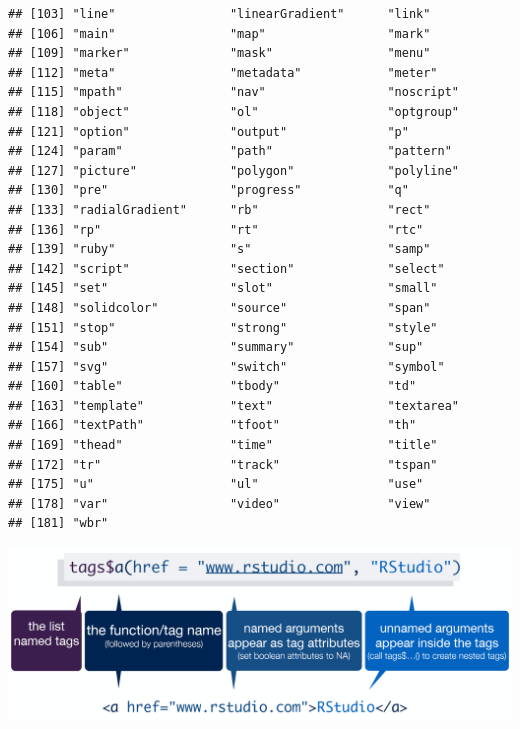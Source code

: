 \documentclass[
]{article}
\begin{document}
\begin{verbatim}
## [103] "line"                "linearGradient"      "link"               
## [106] "main"                "map"                 "mark"               
## [109] "marker"              "mask"                "menu"               
## [112] "meta"                "metadata"            "meter"              
## [115] "mpath"               "nav"                 "noscript"           
## [118] "object"              "ol"                  "optgroup"           
## [121] "option"              "output"              "p"                  
## [124] "param"               "path"                "pattern"            
## [127] "picture"             "polygon"             "polyline"           
## [130] "pre"                 "progress"            "q"                  
## [133] "radialGradient"      "rb"                  "rect"               
## [136] "rp"                  "rt"                  "rtc"                
## [139] "ruby"                "s"                   "samp"               
## [142] "script"              "section"             "select"             
## [145] "set"                 "slot"                "small"              
## [148] "solidcolor"          "source"              "span"               
## [151] "stop"                "strong"              "style"              
## [154] "sub"                 "summary"             "sup"                
## [157] "svg"                 "switch"              "symbol"             
## [160] "table"               "tbody"               "td"                 
## [163] "template"            "text"                "textarea"           
## [166] "textPath"            "tfoot"               "th"                 
## [169] "thead"               "time"                "title"              
## [172] "tr"                  "track"               "tspan"              
## [175] "u"                   "ul"                  "use"                
## [178] "var"                 "video"               "view"               
## [181] "wbr"
\end{verbatim}

\includegraphics{img/tags.png}
\end{document}
